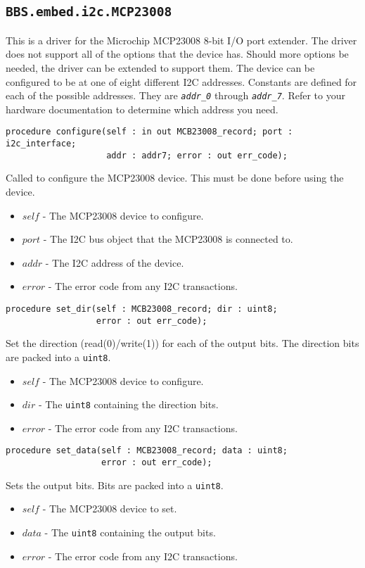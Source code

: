 \documentclass[10pt, openany]{book}
\newcommand{\indexfunc}[1]{\index[func]{#1}}
\newcommand{\package}[1]{\texttt{#1}}
\newcommand{\constant}[1]{\emph{\texttt{#1}}}
\newcommand{\datatype}[1]{\texttt{#1}}
\begin{document}
\subsection{\package{BBS.embed.i2c.MCP23008}}
This is a driver for the Microchip MCP23008 8-bit I/O port extender\cite{MCP23008}.  The driver does not support all of the options that the device has.  Should more options be needed, the driver can be extended to support them.  The device can be configured to be at one of eight different I2C addresses.  Constants are defined for each of the possible addresses.  They are \constant{addr\_0} through \constant{addr\_7}.  Refer to your hardware documentation to determine which address you need.

\begin{lstlisting}
procedure configure(self : in out MCB23008_record; port : i2c_interface;
                    addr : addr7; error : out err_code);
\end{lstlisting}
\indexfunc{configure}
Called to configure the MCP23008 device.  This must be done before using the device.
\begin{itemize}
  \item $self$ - The MCP23008 device to configure.
  \item $port$ - The I2C bus object that the MCP23008 is connected to.
  \item $addr$ - The I2C address of the device.
  \item $error$ - The error code from any I2C transactions.
\end{itemize}

\begin{lstlisting}
procedure set_dir(self : MCB23008_record; dir : uint8;
                  error : out err_code);
\end{lstlisting}
\indexfunc{set\_dir}
Set the direction (read(0)/write(1)) for each of the output bits.  The direction bits are packed into a \datatype{uint8}.
\begin{itemize}
  \item $self$ - The MCP23008 device to configure.
  \item $dir$ - The \datatype{uint8} containing the direction bits.
  \item $error$ - The error code from any I2C transactions.
\end{itemize}

\begin{lstlisting}
procedure set_data(self : MCB23008_record; data : uint8;
                   error : out err_code);
\end{lstlisting}
\indexfunc{set\_data}
Sets the output bits.  Bits are packed into a \datatype{uint8}.
\begin{itemize}
  \item $self$ - The MCP23008 device to set.
  \item $data$ - The \datatype{uint8} containing the output bits.
  \item $error$ - The error code from any I2C transactions.
\end{itemize}
\end{document}
